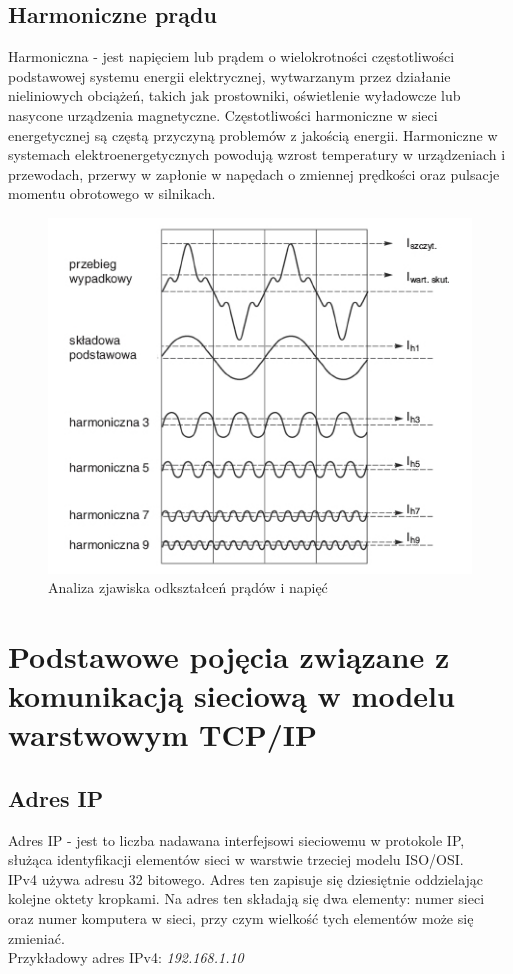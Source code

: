 \documentclass[12pt]{article}
\begin{document}
\subsection{Harmoniczne prądu}
 Harmoniczna - jest napięciem lub prądem o wielokrotności częstotliwości podstawowej systemu energii elektrycznej, wytwarzanym przez działanie nieliniowych obciążeń, takich jak prostowniki, oświetlenie wyładowcze lub nasycone urządzenia magnetyczne. Częstotliwości harmoniczne w sieci energetycznej są częstą przyczyną problemów z jakością energii. Harmoniczne w systemach elektroenergetycznych powodują wzrost temperatury w urządzeniach i przewodach, przerwy w zapłonie w napędach o zmiennej prędkości oraz pulsacje momentu obrotowego w silnikach.
 \begin{figure}
    \centering
    \includegraphics[scale=0.5]{harmonics}
    \caption{Analiza zjawiska odkształceń prądów i napięć}
    \label{fig:my_label}
\end{figure}
\section{Podstawowe pojęcia związane z komunikacją sieciową w modelu warstwowym TCP/IP}
\subsection{Adres IP}
Adres IP - jest to liczba nadawana interfejsowi sieciowemu w protokole IP, służąca identyfikacji elementów sieci w warstwie trzeciej modelu ISO/OSI.\\
IPv4 używa adresu 32 bitowego. Adres ten zapisuje się dziesiętnie oddzielając kolejne oktety kropkami. Na adres ten składają się dwa elementy: numer sieci oraz numer komputera w sieci, przy czym wielkość tych elementów może się zmieniać.\\
Przykładowy adres IPv4: \textit{192.168.1.10}
\end{document}
